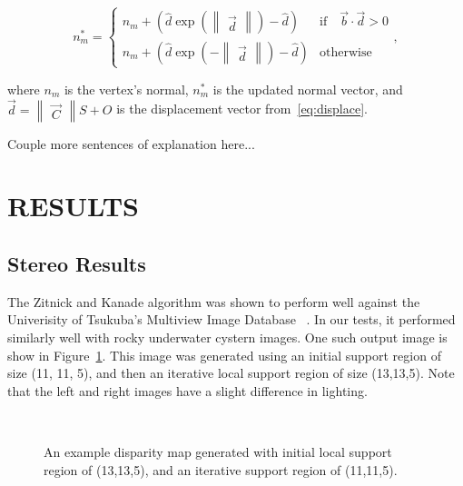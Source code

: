 \documentclass[a4paper,twoside]{article}
\begin{document}
\begin{equation}
n_m^* = \left \{ \begin{array}{ll}
        n_m + \left(\hat{d} \exp\left(\begin{Vmatrix}\vec{d}\end{Vmatrix}\right) - \hat{d}\right) & \text{if} \quad \vec{b} \cdot \vec{d} > 0 \\
        n_m + \left(\hat{d} \exp\left(-\begin{Vmatrix}\vec{d}\end{Vmatrix}\right) - \hat{d}\right) & \text{otherwise}
        \end{array},\right.
        \label{eq:lighting}
\end{equation}


where $n_m$ is the vertex's normal, $n_m^*$ is the updated normal vector, and $\vec{d} = \begin{Vmatrix}\vec{C}\end{Vmatrix} S + O$ is the displacement vector from~\eqref{eq:displace}.

Couple more sentences of explanation here...

\section{\uppercase{Results}}
\label{sec:results}

\subsection{Stereo Results}

The Zitnick and Kanade algorithm was shown to perform well against the Univerisity of Tsukuba's Multiview Image Database ~\cite{stereo:zitKan}.  
In our tests, it performed similarly well with rocky underwater cystern images.  
One such output image is show in Figure~\ref{fig:disparity}.
This image was generated using an initial support region of size (11, 11, 5), and then an iterative local support region of size (13,13,5).
Note that the left and right images have a slight difference in lighting.

\begin{figure}[!h]
	\centering
		\quad %
		\\%
		\medskip
		\caption{An example disparity map generated with initial local support region of (13,13,5), and an iterative support region of (11,11,5).}
		\label{fig:disparity}
\end{figure}
\end{document}
